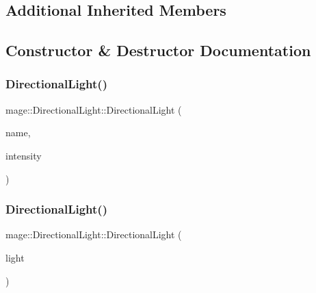 \subsection*{Additional Inherited Members}


\subsection{Constructor \& Destructor Documentation}
\hypertarget{classmage_1_1_directional_light_a8a5ef8d4445b092db8bbba001e1ce874}{}\label{classmage_1_1_directional_light_a8a5ef8d4445b092db8bbba001e1ce874} 
\subsubsection{\texorpdfstring{Directional\+Light()}{DirectionalLight()}\hspace{0.1cm}{\footnotesize\ttfamily [1/3]}}
{\footnotesize\ttfamily mage\+::\+Directional\+Light\+::\+Directional\+Light (\begin{DoxyParamCaption}\item[{const string}]{name,  }\item[{const \hyperlink{structmage_1_1_r_g_b_spectrum}{R\+G\+B\+Spectrum} \&}]{intensity }\end{DoxyParamCaption})\hspace{0.3cm}{\ttfamily [explicit]}}

\hypertarget{classmage_1_1_directional_light_a6939817ef5aeb6347d6d1aa963241f49}{}\label{classmage_1_1_directional_light_a6939817ef5aeb6347d6d1aa963241f49} 
\subsubsection{\texorpdfstring{Directional\+Light()}{DirectionalLight()}\hspace{0.1cm}{\footnotesize\ttfamily [2/3]}}
{\footnotesize\ttfamily mage\+::\+Directional\+Light\+::\+Directional\+Light (\begin{DoxyParamCaption}\item[{const \hyperlink{classmage_1_1_directional_light}{Directional\+Light} \&}]{light }\end{DoxyParamCaption})\hspace{0.3cm}{\ttfamily [default]}}


